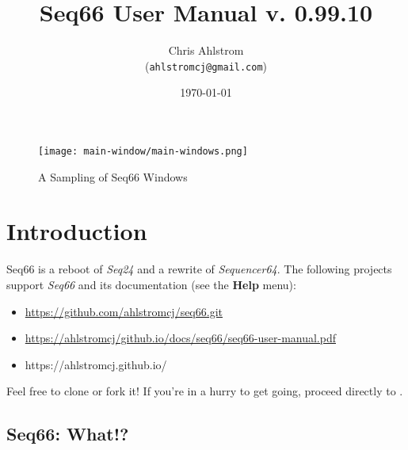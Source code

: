 \documentclass[
 11pt,
 twoside,
 a4paper,
 final                                 %
]{article}
\begin{document}
\title{Seq66 User Manual v. 0.99.10}
\author{Chris Ahlstrom \\
   (\texttt{ahlstromcj@gmail.com})}
\date{\today}
\maketitle

\begin{figure}[H]
   \centering 
   \texttt{[image: main-window/main-windows.png]}
   \caption*{A Sampling of Seq66 Windows}
\end{figure}

\clearpage                             %

\tableofcontents
\listoffigures                         %
\listoftables                          %

%

\parindent 0pt
\parskip 9pt

\rhead{\rightmark}         %

\section{Introduction}
\label{sec:introduction}

   Seq66 is a reboot of \textsl{Seq24} and a rewrite of
   \textsl{Sequencer64}.
   The following projects support \textsl{Seq66} and its documentation (see
   the \textbf{Help} menu):

   \begin{itemize}
      \item \url{https://github.com/ahlstromcj/seq66.git}
      \item \url{https://ahlstromcj/github.io/docs/seq66/seq66-user-manual.pdf}
      \item https://ahlstromcj.github.io/
   \end{itemize}

   Feel free to clone or fork it!
   If you're in a hurry to get going, proceed directly to
   .

\subsection{Seq66: What!?}
\label{subsec:what_is_seq66}
\end{document}
